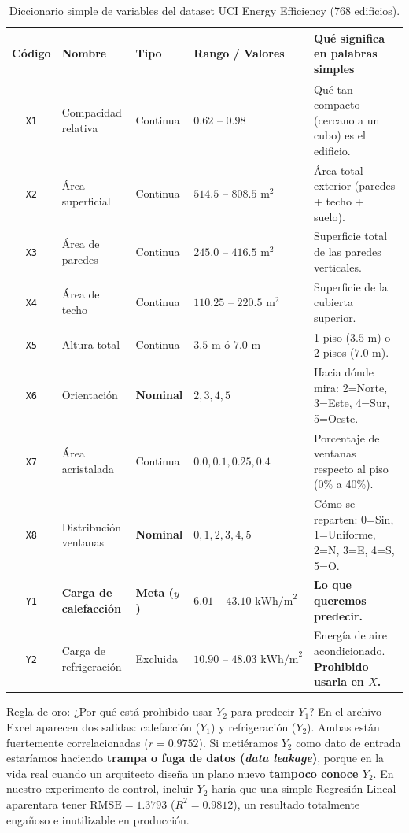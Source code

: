 \documentclass[11pt,a4paper]{article}
\begin{document}
\begin{table}[H]
\centering
\caption{Diccionario simple de variables del dataset UCI Energy Efficiency (768 edificios).}
\label{tab:variables}
\small
\begin{tabular}{clllp{5.8cm}}
\toprule
\textbf{Código} & \textbf{Nombre} & \textbf{Tipo} & \textbf{Rango / Valores} & \textbf{Qué significa en palabras simples} \\
\midrule
\texttt{X1} & Compacidad relativa & Continua & $0.62 \text{ -- } 0.98$ & Qué tan compacto (cercano a un cubo) es el edificio. \\
\texttt{X2} & Área superficial & Continua & $514.5 \text{ -- } 808.5\text{ m}^2$ & Área total exterior (paredes + techo + suelo). \\
\texttt{X3} & Área de paredes & Continua & $245.0 \text{ -- } 416.5\text{ m}^2$ & Superficie total de las paredes verticales. \\
\texttt{X4} & Área de techo & Continua & $110.25 \text{ -- } 220.5\text{ m}^2$ & Superficie de la cubierta superior. \\
\texttt{X5} & Altura total & Continua & $3.5\text{ m}$ ó $7.0\text{ m}$ & 1 piso ($3.5\text{ m}$) o 2 pisos ($7.0\text{ m}$). \\
\texttt{X6} & Orientación & \textbf{Nominal} & $2, 3, 4, 5$ & Hacia dónde mira: 2=Norte, 3=Este, 4=Sur, 5=Oeste. \\
\texttt{X7} & Área acristalada & Continua & $0.0, 0.1, 0.25, 0.4$ & Porcentaje de ventanas respecto al piso (0\% a 40\%). \\
\texttt{X8} & Distribución ventanas & \textbf{Nominal} & $0, 1, 2, 3, 4, 5$ & Cómo se reparten: 0=Sin, 1=Uniforme, 2=N, 3=E, 4=S, 5=O. \\
\midrule
\texttt{Y1} & \textbf{Carga de calefacción} & \textbf{Meta ($y$)} & $6.01 \text{ -- } 43.10\text{ kWh/m}^2$ & \textbf{Lo que queremos predecir.} \\
\texttt{Y2} & Carga de refrigeración & Excluida & $10.90 \text{ -- } 48.03\text{ kWh/m}^2$ & Energía de aire acondicionado. \textbf{Prohibido usarla en $X$.} \\
\bottomrule
\end{tabular}
\end{table}

\begin{cajaalerta}{Regla de oro: ¿Por qué está prohibido usar $Y_2$ para predecir $Y_1$?}
En el archivo Excel aparecen dos salidas: calefacción ($Y_1$) y refrigeración ($Y_2$). Ambas están fuertemente correlacionadas ($r = \mathbf{0.9752}$). Si metiéramos $Y_2$ como dato de entrada estaríamos haciendo \textbf{trampa o fuga de datos (\textit{data leakage})}, porque en la vida real cuando un arquitecto diseña un plano nuevo \textbf{tampoco conoce $Y_2$}. En nuestro experimento de control, incluir $Y_2$ haría que una simple Regresión Lineal aparentara tener $\text{RMSE} = 1.3793$ ($R^2 = 0.9812$), un resultado totalmente engañoso e inutilizable en producción.
\end{cajaalerta}
\end{document}
